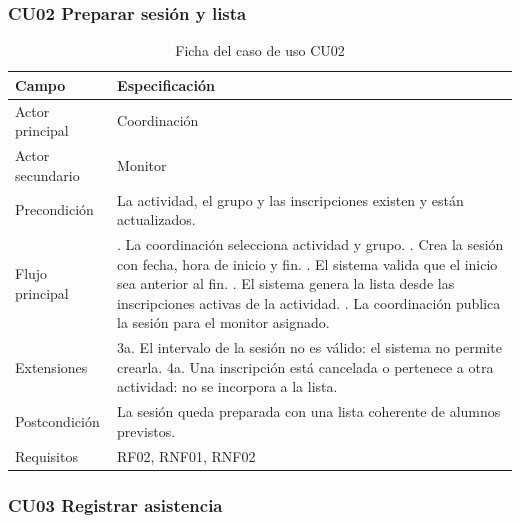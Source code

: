 \subsubsection{CU02 Preparar sesión y lista}\label{sec:4-1-2-2}

\begin{table}[H]
\centering\small
\begin{tabularx}{\textwidth}{>{\hsize=0.387\hsize\raggedright\arraybackslash}X>{\hsize=1.613\hsize\raggedright\arraybackslash}X}
\toprule
\rowcolor{cabeceratabla} \textbf{Campo} & \textbf{Especificación} \\
\midrule
Actor principal & Coordinación \\
Actor secundario & Monitor \\
Precondición & La actividad, el grupo y las inscripciones existen y están actualizados. \\
Flujo principal & 1. La coordinación selecciona actividad y grupo. \newline 2. Crea la sesión con fecha, hora de inicio y fin. \newline 3. El sistema valida que el inicio sea anterior al fin. \newline 4. El sistema genera la lista desde las inscripciones activas de la actividad. \newline 5. La coordinación publica la sesión para el monitor asignado. \\
Extensiones & 3a. El intervalo de la sesión no es válido: el sistema no permite crearla. \newline 4a. Una inscripción está cancelada o pertenece a otra actividad: no se incorpora a la lista. \\
Postcondición & La sesión queda preparada con una lista coherente de alumnos previstos. \\
Requisitos & RF02, RNF01, RNF02 \\
\bottomrule
\end{tabularx}
\caption{Ficha del caso de uso CU02}\label{tab:26}
\end{table}

\subsubsection{CU03 Registrar asistencia}\label{sec:4-1-2-3}

